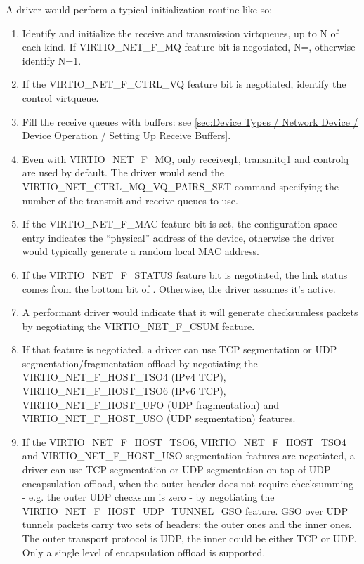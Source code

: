 A driver would perform a typical initialization routine like so:

\begin{enumerate}
\item Identify and initialize the receive and
  transmission virtqueues, up to N of each kind. If
  VIRTIO_NET_F_MQ feature bit is negotiated,
  N=, otherwise identify N=1.

\item If the VIRTIO_NET_F_CTRL_VQ feature bit is negotiated,
  identify the control virtqueue.

\item Fill the receive queues with buffers: see \ref{sec:Device Types / Network Device / Device Operation / Setting Up Receive Buffers}.

\item Even with VIRTIO_NET_F_MQ, only receiveq1, transmitq1 and
  controlq are used by default.  The driver would send the
  VIRTIO_NET_CTRL_MQ_VQ_PAIRS_SET command specifying the
  number of the transmit and receive queues to use.

\item If the VIRTIO_NET_F_MAC feature bit is set, the configuration
  space  entry indicates the ``physical'' address of the
  device, otherwise the driver would typically generate a random
  local MAC address.

\item If the VIRTIO_NET_F_STATUS feature bit is negotiated, the link
  status comes from the bottom bit of .
  Otherwise, the driver assumes it's active.

\item A performant driver would indicate that it will generate checksumless
  packets by negotiating the VIRTIO_NET_F_CSUM feature.

\item If that feature is negotiated, a driver can use TCP segmentation or UDP
  segmentation/fragmentation offload by negotiating the VIRTIO_NET_F_HOST_TSO4 (IPv4
  TCP), VIRTIO_NET_F_HOST_TSO6 (IPv6 TCP), VIRTIO_NET_F_HOST_UFO
  (UDP fragmentation) and VIRTIO_NET_F_HOST_USO (UDP segmentation) features.

\item If the VIRTIO_NET_F_HOST_TSO6, VIRTIO_NET_F_HOST_TSO4 and VIRTIO_NET_F_HOST_USO
  segmentation features are negotiated, a driver can
  use TCP segmentation or UDP segmentation on top of UDP encapsulation
  offload, when the outer header does not require checksumming - e.g.
  the outer UDP checksum is zero - by negotiating the
  VIRTIO_NET_F_HOST_UDP_TUNNEL_GSO feature.
  GSO over UDP tunnels packets carry two sets of headers: the outer ones
  and the inner ones. The outer transport protocol is UDP, the inner
  could be either TCP or UDP. Only a single level of encapsulation
  offload is supported.


\end{enumerate}
